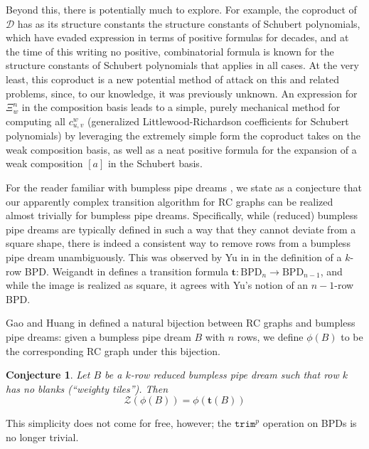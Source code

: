 \documentclass[a4paper,fleqn]{cas-sc}
\newtheorem{conjecture}[theorem]{Conjecture}
\theoremstyle{definition}
\theoremstyle{remark}
\numberwithin{equation}{subsection}
\newcommand{\trm}{\mathtt{trim}}
\newcommand{\zeromap}{\mathcal{Z}}
\newcommand{\dsch}{\ensuremath{\Xi}}
\newcommand{\dcoma}{\mathcal{D}}
\begin{document}
Beyond this, there is potentially much to explore. For example, the coproduct of $\dcoma$ has as its structure constants the structure constants of Schubert polynomials, which have evaded expression in terms of positive formulas for decades, and at the time of this writing no positive, combinatorial formula is known for the structure constants of Schubert polynomials that applies in all cases. At the very least, this coproduct is a new potential method of attack on this and related problems, since, to our knowledge, it was previously unknown. An expression for $\dsch_w^n$ in the composition basis leads to a simple, purely mechanical method for computing all $c_{u,v}^w$ (generalized Littlewood-Richardson coefficients for Schubert polynomials) by leveraging the extremely simple form the coproduct takes on the weak composition basis, as well as a neat positive formula for the expansion of a weak composition $[a]$ in the Schubert basis.

For the reader familiar with bumpless pipe dreams \cite{lam2021back}, we state as a conjecture that our apparently complex transition algorithm for RC graphs can be realized almost trivially for bumpless pipe dreams. Specifically, while (reduced) bumpless pipe dreams are typically defined in such a way that they cannot deviate from a square shape, there is indeed a consistent way to remove rows from a bumpless pipe dream unambiguously. This was observed by Yu in \cite[Lemma~3.18]{Yu2025EmbeddingBP} in the definition of a $k$-row BPD. Weigandt in \cite{Weigandt2021} defines a transition formula $\mathbf{t}:\mathrm{BPD}_n\to\mathrm{BPD}_{n-1}$, and while the image is realized as square, it agrees with Yu's notion of an $n-1$-row BPD.

Gao and Huang in \cite{GaoHuang2023} defined a natural bijection between RC graphs and bumpless pipe dreams: given a bumpless pipe dream $B$ with $n$ rows, we define $\phi(B)$ to be the corresponding RC graph under this bijection.
\begin{conjecture}
Let $B$ be a $k$-row reduced bumpless pipe dream such that row $k$ has no blanks (``weighty tiles''). Then 
$$\zeromap(\phi(B)) = \phi(\mathbf{t}(B))$$
\end{conjecture}

This simplicity does not come for free, however; the $\trm^p$ operation on BPDs is no longer trivial.
\end{document}
